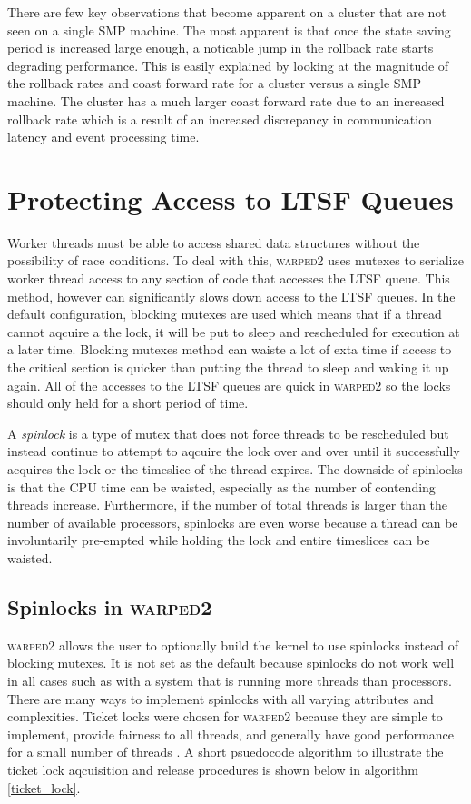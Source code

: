 \documentclass[11pt]{book}
\begin{document}
There are few key observations that become apparent on a cluster that are not seen on a single
SMP machine.  The most apparent is that once the state saving period is increased large enough,
a noticable jump in the rollback rate starts degrading performance.  This is easily explained
by looking at the magnitude of the rollback rates and coast forward rate for a cluster versus
a single SMP machine.  The cluster has a much larger coast forward rate due to an increased rollback
rate which is a result of an increased discrepancy in communication latency and event processing time.

\section{Protecting Access to LTSF Queues}

Worker threads must be able to access shared data structures without the possibility of
race conditions.  To deal with this, \textsc{warped2} uses mutexes to serialize worker thread
access to any section of code that accesses the LTSF queue.  This method, however can significantly
slows down access to the LTSF queues.  In the default configuration, blocking mutexes are used
which means that if a thread cannot aqcuire a the lock, it will be put to sleep and rescheduled
for execution at a later time.  Blocking mutexes method can waiste a lot of exta time if access to the
critical section is quicker than putting the thread to sleep and waking it up again.  All of the
accesses to the LTSF queues are quick in \textsc{warped2} so the locks should only held for a short
period of time.

A \emph{spinlock} is a type of mutex that does not force threads to be rescheduled but
instead continue to attempt to aqcuire the lock over and over until it successfully acquires
the lock or the timeslice of the thread expires.  The downside of spinlocks is that the CPU time
can be waisted, especially as the number of contending threads increase.  Furthermore, if the
number of total threads is larger than the number of available processors, spinlocks are
even worse because a thread can be involuntarily pre-empted while holding the lock and entire
timeslices can be waisted.

\subsection{Spinlocks in \textsc{warped2}}

\textsc{warped2} allows the user to optionally build the kernel to use spinlocks instead of
blocking mutexes.  It is not set as the default because spinlocks do not work well in all cases
such as with a system that is running more threads than processors.
There are many ways to implement spinlocks with all varying attributes and complexities.
Ticket locks were chosen for \textsc{warped2} because they are simple to implement, provide
fairness to all threads, and generally have good performance for a small number of threads
\cite{lockless-10}.  A short psuedocode algorithm to illustrate the ticket lock aqcuisition and
release procedures is shown below in algorithm \ref{ticket_lock}.
\end{document}
